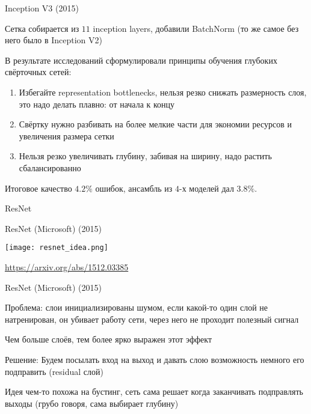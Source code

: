 \documentclass[notes,12pt, aspectratio=169]{beamer}
\newenvironment{transitionframe}{
  \setbeamercolor{background canvas}{bg=yellow}
  \begin{frame}}{
    \end{frame}
}
\newenvironment{wideitemize}{\itemize\addtolength{\itemsep}{10pt}}{\enditemize}
\begin{document}
\begin{frame}{Inception V3 (2015)}
\begin{wideitemize}
	\item  Сетка собирается из $11$ inception layers, добавили BatchNorm (то же самое без него было в Inception V2)
	
	\item В результате исследований сформулировали \alert{принципы обучения глубоких свёрточных сетей:}
	
	\begin{enumerate}
		\item  Избегайте representation bottlenecks, нельзя резко снижать размерность слоя, это надо делать плавно: от начала к концу
		\item Свёртку нужно разбивать на более мелкие части для экономии ресурсов и увеличения размера сетки 
		\item Нельзя резко увеличивать глубину, забивая на ширину, надо растить сбалансированно
	\end{enumerate} 

	\item Итоговое качество $4.2\%$ ошибок, ансамбль из $4$-х моделей дал $3.8\%$. 
\end{wideitemize}
\end{frame}


 \begin{transitionframe}
	\begin{center}
		\Huge  ResNet
	\end{center}
\end{transitionframe}


\begin{frame}{ResNet (Microsoft) (2015)}
\begin{center}
	\texttt{[image: resnet\_idea.png]}
\end{center}
\vfill %
\footnotesize
\color{blue} \url{https://arxiv.org/abs/1512.03385}
\end{frame}


\begin{frame}{ResNet (Microsoft) (2015)}
\begin{wideitemize}
	\item  \alert{Проблема:} слои инициализированы шумом, если какой-то один слой не натренирован, он убивает работу сети, через него не проходит полезный сигнал 
	\item Чем больше слоёв, тем более ярко выражен этот эффект 
	\item \alert{Решение:} Будем посылать вход на выход и давать слою возможность немного его подправить (residual слой)
	\item Идея чем-то похожа на бустинг, сеть сама решает когда заканчивать подправлять выходы (грубо говоря, сама выбирает глубину)
\end{wideitemize}
\end{frame}
\end{document}
